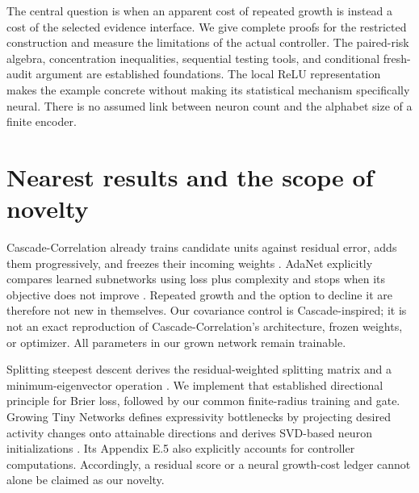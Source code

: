 \documentclass[11pt]{article}
\theoremstyle{remark}\newtheorem{remark}[theorem]{Remark}
\begin{document}
The central question is when an apparent cost of repeated growth is instead a
cost of the selected evidence interface. We give complete proofs for the
restricted construction and measure the limitations of the actual controller.
The paired-risk algebra, concentration inequalities, sequential testing tools,
and conditional fresh-audit argument are established foundations. The local
ReLU representation makes the example concrete without making its statistical
mechanism specifically neural. There is no assumed link between neuron count
and the alphabet size of a finite encoder.

\section{Nearest results and the scope of novelty}
Cascade-Correlation already trains candidate units against residual error,
adds them progressively, and freezes their incoming weights
\cite{fahlman1990}. AdaNet explicitly compares learned subnetworks using loss
plus complexity and stops when its objective does not improve
\cite[Section 5.2, Figure 3]{cortes2017adanet}. Repeated growth and the option
to decline it are therefore not new in themselves. Our covariance control is
Cascade-inspired; it is not an exact reproduction of Cascade-Correlation's
architecture, frozen weights, or optimizer. All parameters in our grown
network remain trainable.

Splitting steepest descent derives the residual-weighted splitting matrix
and a minimum-eigenvector operation
\cite[Section 2.1, Definition 2.1]{ssd2019}. We implement that established
directional principle for Brier loss, followed by our common finite-radius
training and gate. Growing Tiny Networks defines expressivity bottlenecks by
projecting desired activity changes onto attainable directions and derives
SVD-based neuron initializations
\cite[Definition 3.1, Propositions 3.1--3.3]{verbockhaven2024growing}.
Its Appendix E.5 also explicitly accounts for controller computations.
Accordingly, a residual score or a neural growth-cost ledger cannot alone be
claimed as our novelty.
\end{document}
